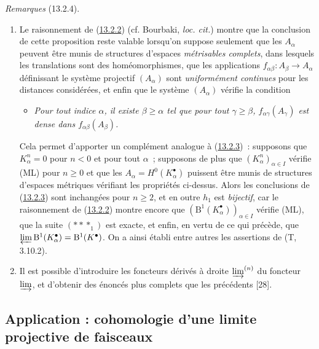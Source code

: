 \begin{env}[13.2.4]
\label{0.13.2.4-fr}
\emph{Remarques} (13.2.4).
\begin{enumerate}
\item[\emph{(i)}]
Le raisonnement de (\hyperref[0.13.2.2-fr]{13.2.2}) (cf. Bourbaki,
\emph{loc. cit.}) montre que la conclusion de cette proposition reste
valable lorsqu'on suppose seulement que les $A_\alpha$ peuvent être munis
de structures d'espaces \emph{métrisables complets}, dans lesquels les
translations sont des homéomorphismes, que les applications
$f_{\alpha\beta}:A_\beta\to A_\alpha$ définissant le système projectif
$(A_\alpha)$ sont \emph{uniformément continues} pour les distances
considérées, et enfin que le système $(A_\alpha)$ vérifie la condition
\begin{itemize}
\item[\textbf{(ML')}]
\emph{Pour tout indice $\alpha$, il existe $\beta\geq\alpha$ tel que pour
tout $\gamma\geq\beta$, $f_{\alpha\gamma}(A_\gamma)$ est dense dans
$f_{\alpha\beta}(A_\beta)$.}
\end{itemize}

Cela permet d'apporter un complément analogue à
(\hyperref[0.13.2.3-fr]{13.2.3})~: supposons que
$K_\alpha^n=0$ pour $n<0$ et pour tout $\alpha$~; supposons de plus que
$(K_\alpha^n)_{\alpha\in I}$ vérifie (ML) pour $n\geq0$ et que les
$A_\alpha=H^0(K_\alpha^\bullet)$ puissent être munis de structures
d'espaces métriques vérifiant les propriétés ci-dessus. Alors les
conclusions de (\hyperref[0.13.2.3-fr]{13.2.3}) sont inchangées pour
$n\geq2$, et en outre $h_1$ est \emph{bijectif}, car le raisonnement de
(\hyperref[0.13.2.2-fr]{13.2.2}) montre encore que
$(\mathrm B^1(K_\alpha^\bullet))_{\alpha\in I}$ vérifie (ML), que la suite
$(***_1)$ est exacte, et enfin, en vertu de ce qui précède, que
$\varprojlim\mathrm B^1(K_\alpha^\bullet)=\mathrm B^1(K^\bullet)$. On a
ainsi établi entre autres les assertions de (T, 3.10.2).

\item[\emph{(ii)}]
Il est possible d'introduire les foncteurs dérivés à droite
$\varinjlim^{(n)}$ du foncteur $\varinjlim$, et d'obtenir des énoncés
plus complets que les précédents [28].
\end{enumerate}
\end{env}

\subsection{Application : cohomologie d'une limite projective de faisceaux}
\label{subsection:0.13.3-fr}

